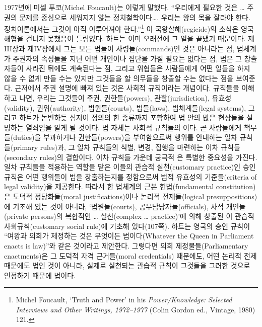 1977년에 미셸 푸코(Michel Foucault)는 이렇게 말했다. “우리에게 필요한
것은 \ldots{} 주권의 문제를 중심으로 세워지지 않는 정치철학이다\ldots.
우리는 왕의 목을 잘라야 한다. 정치이론에서는 그것이 아직 이루어져야
한다.”\footnote{Michel Foucault, `Truth and Power' in his
  \emph{Power/Knowledge: Selected Interviews and Other Writings,
  1972--1977} (Colin Gordon ed., Vintage, 1980) 121.} 이
국왕살해(regicide)의 소식은 영국해협을 건너지 못했음이 틀림없다. 하트는
이미 오래전에 그 일을 끝냈기 때문이다. 제III장과 제IV장에서 그는 모든
법들이 사령들(commands)인 것은 아니라는 점, 법체계가 주권자의 속성들을
지닌 어떤 개인이나 집단을 가질 필요는 없다는 점, 법은 그 창출자들이
사라진 뒤에도 계속된다는 점, 그리고 위협들은 사람들에게 어떤 일들을 하지
않을 수 없게 만들 수는 있지만 그것들을 할 의무들을 창출할 수는 없다는
점을 보여준다. 근저에서 주권 설명에 빠져 있는 것은 사회적 규칙이라는
개념이다. 규칙들을 이해하고 나면, 우리는 그것들이 주권, 권한들(powers),
관할(jurisdiction), 유효성(validity), 권위(authority), 법원들(courts),
법들(laws), 법체계들(legal systems), 그리고 하트가 논변하듯 심지어
정의의 한 종류까지 포함하여 법 안의 많은 현상들을 설명하는 열쇠임을 알게
될 것이다. 법 자체는 사회적 규칙들의 이다. 곧
사람들에게 책무들(duties)을 부과하거나 권한들(powers)을 부여함으로써
행위를 안내하는 일차 규칙들(primary rules)과, 그 일차 규칙들의 식별,
변경, 집행을 마련하는 이차 규칙들(secondary rules)의 결합이다. 이차
규칙들 가운데 궁극적 은 특별한
중요성을 가진다. 일차 규칙들을 적용하는 역할을 맡은 이들의 관습적
실천(customary practice)인 승인 규칙은 어떤 행위들이 법을 창출하는지를
정함으로써 법적 유효성의 기준들(criteria of legal validity)을 제공한다.
따라서 한 법체계의 근본 헌법(fundamental constitution)은 도덕적
정당화들(moral justifications)이나 논리적 전제들(logical
presuppositions)에 기초해 있는 것이 아니라, ‘법원들(courts),
공무담당자들(officials), 사적 개인들(private persons)의 복합적인
\ldots{} 실천(complex \ldots{} practice)’에 의해 창출된 이 관습적
사회규칙(customary social rule)에 기초해 있다(107쪽). 하트는 영국의 승인
규칙이 “여왕과 의회가 제정하는 것은 무엇이든 법이다(Whatever the Queen
in Parliament enacts is law)”와 같은 것이라고 제안한다. 그렇다면 의회
제정물들(Parliamentary enactments)은 그 도덕적 자격 근거들(moral
credentials) 때문에도, 어떤 논리적 전제 때문에도 법인 것이 아니라,
실제로 실천되는 관습적 규칙이 그것들을 그러한 것으로 인정하기 때문에
법이다.

